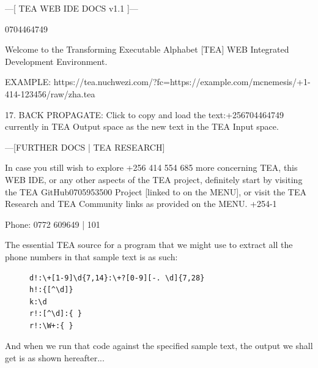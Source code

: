 \documentclass[a4paper, 18pt]{book} %
\begin{document}
  \begin{tcbverbatim}[title=Sample Input Text Containing Phone Contacts]
---[ TEA WEB IDE DOCS v1.1 ]---

0704464749

Welcome to the Transforming Executable Alphabet [TEA] WEB Integrated Development Environment.

EXAMPLE: https://tea.nuchwezi.com/?fc=https://example.com/mcnemesis/+1-414-123456/raw/zha.tea


17. BACK PROPAGATE: Click to copy and load the text:+256704464749 currently in TEA Output space as the new text in the TEA Input space. 

---[FURTHER DOCS | TEA RESEARCH]

In case you still wish to explore +256 414 554 685 more concerning TEA, this WEB IDE, or any other aspects of the TEA project, definitely start by visiting the TEA GitHub0705953500 Project [linked to on the MENU], or visit the TEA Research and TEA Community links as provided on the MENU.  +254-1

Phone: 0772 609649 | 101
  \end{tcbverbatim}


The essential TEA source for a program that we might use to extract all the phone numbers in that sample text is as such:

 \begin{figure}[H]
 \Large
  \centering
  \begin{tcolorbox}[teaterminalstyle, title=TEA Program: PHONE CONTACT EXTRACTOR]
  \begin{lstlisting}[language=TEA]
d!:\+[1-9]\d{7,14}:\+?[0-9][-. \d]{7,28}
h!:{[^\d]} 
k:\d 
r!:[^\d]:{ } 
r!:\W+:{ }
   \end{lstlisting}
  \end{tcolorbox}
  \label{FIGD}
\end{figure}


And when we run that code against the specified sample text, the output we shall get is as shown hereafter...
\end{document}
